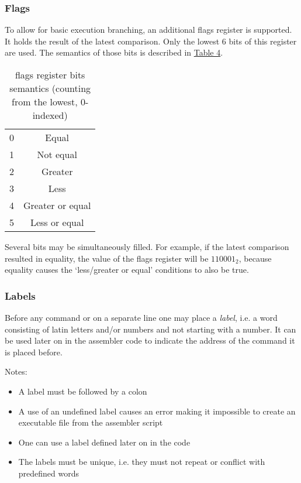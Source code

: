 \documentclass{article}
\newcommand{\St}[1]{{\fontfamily{qcr}\selectfont #1}}
\begin{document}
\hypertarget{flags:details}{}
\subsubsection{Flags}

To allow for basic execution branching, an additional \St{flags} register is supported. It holds the result of the latest comparison. Only the lowest 6 bits of this register are used. The semantics of those bits is described in \hyperlink{flags:bits}{Table 4}.

\hypertarget{flags:bits}{}
{
\renewcommand{\arraystretch}{1.4}
\begin{table}[h!]
\centering
\caption{\St{flags} register bits semantics (counting from the lowest, 0-indexed)}
\vspace{2mm}
\begin{tabular}{| c | c |}
 \hline
 0 & Equal \\
 1 & Not equal \\
 2 & Greater \\
 3 & Less \\
 4 & Greater or equal \\
 5 & Less or equal \\
 \hline
\end{tabular}
\end{table}
}

Several bits may be simultaneously filled. For example, if the latest comparison resulted in equality, the value of the \St{flags} register will be $110001_2$, because equality causes the \lq less/greater or equal\rq{} conditions to also be true.

\subsubsection{Labels}

Before any command or on a separate line one may place a \textit{label}, i.e. a word consisting of latin letters and/or numbers and not starting with a number. It can be used later on in the assembler code to indicate the address of the command it is placed before. 

Notes:

\begin{itemize}
	\item A label must be followed by a colon
	\item A use of an undefined label causes an error making it impossible to create an executable file from the assembler script
	\item One can use a label defined later on in the code
	\item The labels must be unique, i.e. they must not repeat or conflict with predefined words
\end{itemize}
\end{document}
